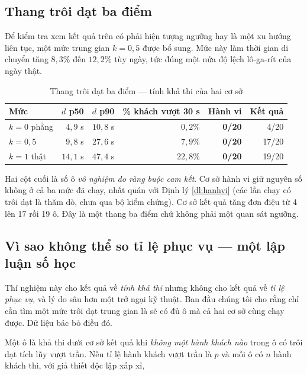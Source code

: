 \subsection{Thang trôi dạt ba điểm}

Để kiểm tra xem kết quả trên có phải hiện tượng ngưỡng hay là một xu hướng liên tục, một mức
trung gian $k = 0{,}5$ được bổ sung. Mức này làm thời gian di chuyển tăng $8{,}3\%$ đến
$12{,}2\%$ tùy ngày, tức đúng một nửa độ lệch lô-ga-rít của ngày thật.

\begin{table}[htbp]
\centering
\caption{Thang trôi dạt ba điểm --- tính khả thi của hai cơ sở}
\label{bang:thang-troidat}
\small
\begin{tabular}{@{}lrrrrr@{}}
\toprule
\textbf{Mức} & $d$ \textbf{p50} & $d$ \textbf{p90} & \textbf{\% khách vượt 30 s} & \textbf{Hành vi} & \textbf{Kết quả}\\
\midrule
$k=0$ phẳng & $4{,}9$ s & $10{,}8$ s & $0{,}2\%$ & \textbf{0/20} & 4/20\\
$k=0{,}5$ & $9{,}8$ s & $27{,}6$ s & $7{,}9\%$ & \textbf{0/20} & 17/20\\
$k=1$ thật & $14{,}1$ s & $47{,}4$ s & $22{,}8\%$ & \textbf{0/20} & 19/20\\
\bottomrule
\end{tabular}
\end{table}

Hai cột cuối là số ô \emph{vô nghiệm do ràng buộc cam kết}. Cơ sở hành vi giữ nguyên số không ở
cả ba mức đã chạy, nhất quán với Định lý \ref{dl:hanhvi} (các lần chạy có trôi dạt là thăm dò, chưa qua
bộ kiểm chứng). Cơ sở kết quả tăng đơn điệu từ 4 lên 17 rồi
19 ô. Đây là một thang ba điểm chứ không phải một quan sát ngưỡng.

\subsection{Vì sao không thể so tỉ lệ phục vụ --- một lập luận số học}

Thí nghiệm này cho kết quả về \emph{tính khả thi} nhưng không cho kết quả về \emph{tỉ lệ phục
vụ}, và lý do sâu hơn một trở ngại kỹ thuật. Ban đầu chúng tôi cho rằng chỉ cần tìm một mức
trôi dạt trung gian là sẽ có đủ ô mà cả hai cơ sở cùng chạy được. Dữ liệu bác bỏ điều đó.

Một ô là khả thi dưới cơ sở kết quả khi \emph{không một hành khách nào} trong ô có trôi dạt tích
lũy vượt trần. Nếu tỉ lệ hành khách vượt trần là $p$ và mỗi ô có $n$ hành khách thì, với giả
thiết độc lập xấp xỉ,

